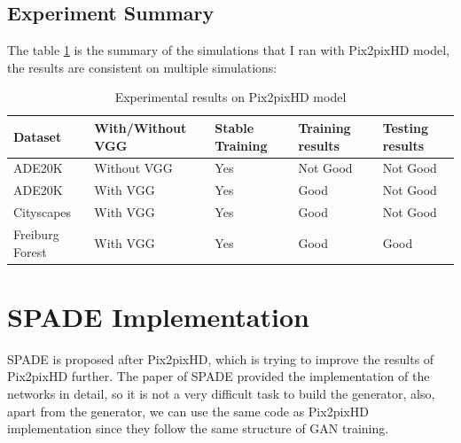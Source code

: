 \subsection{Experiment Summary}
The table \ref{experimental results on Pix2pixHD} is the summary of the simulations that I ran with Pix2pixHD model, 
the results are consistent on multiple simulations:
\begin{table}[H]
    \begin{center}
    \begin{tabular}{|l|l|l|l|l|}\hline\hline
    Dataset&With/Without VGG&Stable Training&Training results&Testing results\\
    \hline
    ADE20K&Without VGG&Yes&Not Good&Not Good\\
    ADE20K&With VGG&Yes&Good&Not Good\\
    Cityscapes&With VGG&Yes&Good&Not Good\\
    Freiburg Forest&With VGG&Yes&Good&Good\\
    \hline\hline
    \end{tabular}
    \end{center}
    \caption{Experimental results on Pix2pixHD model}
    \label{experimental results on Pix2pixHD}
\end{table}

\section{SPADE Implementation}
\nocite{SPADE-blog-1}
\nocite{SPADE-blog-2}
SPADE is proposed after Pix2pixHD, which is trying to improve the results of Pix2pixHD further. 
The paper of SPADE provided the implementation of the networks in detail, so it is not 
a very difficult task to build the generator, also, apart from the generator, we can use the same 
code as Pix2pixHD implementation since they follow the same structure of GAN training.
